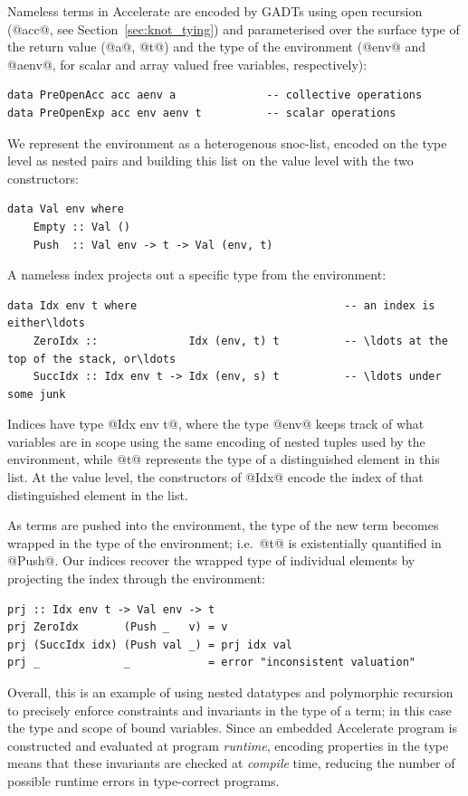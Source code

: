 Nameless terms in Accelerate are encoded by GADTs using open recursion (@acc@,
see Section~\ref{sec:knot_tying}) and parameterised over the surface type of the
return value (@a@, @t@) and the type of the environment (@env@ and @aenv@, for
scalar and array valued free variables, respectively):
%
\begin{lstlisting}[style=haskell]
data PreOpenAcc acc aenv a              -- collective operations
data PreOpenExp acc env aenv t          -- scalar operations
\end{lstlisting}

We represent the environment as a heterogenous snoc-list, encoded on the type
level as nested pairs and building this list on the value level with the two
constructors:
%
\begin{lstlisting}[style=haskell]
data Val env where
    Empty :: Val ()
    Push  :: Val env -> t -> Val (env, t)
\end{lstlisting}
%
A nameless  index projects out a specific type from the
environment:
%
\begin{lstlisting}[style=haskell]
data Idx env t where                                -- an index is either\ldots
    ZeroIdx ::              Idx (env, t) t          -- \ldots at the top of the stack, or\ldots
    SuccIdx :: Idx env t -> Idx (env, s) t          -- \ldots under some junk
\end{lstlisting}
%
Indices have type @Idx env t@, where the type @env@ keeps track of what
variables are in scope using the same encoding of nested tuples used by the
environment, while @t@ represents the type of a distinguished element in this
list. At the value level, the constructors of @Idx@ encode the index of that
distinguished element in the list.

As terms are pushed into the environment, the type of the new term becomes
wrapped in the type of the environment; i.e.\ @t@ is existentially quantified in
@Push@. Our  indices recover the wrapped type of individual
elements by projecting the index through the environment:
%
\begin{lstlisting}[style=haskell]
prj :: Idx env t -> Val env -> t
prj ZeroIdx       (Push _   v) = v
prj (SuccIdx idx) (Push val _) = prj idx val
prj _             _            = error "inconsistent valuation"
\end{lstlisting}

Overall, this is an example of using nested datatypes and polymorphic recursion
to precisely enforce constraints and invariants in the type of a term; in this
case the type and scope of bound variables. Since an embedded Accelerate program is
constructed and evaluated at program \emph{runtime}, encoding properties in the
type means that these invariants are checked at \emph{compile} time, reducing
the number of possible runtime errors in type-correct programs.


